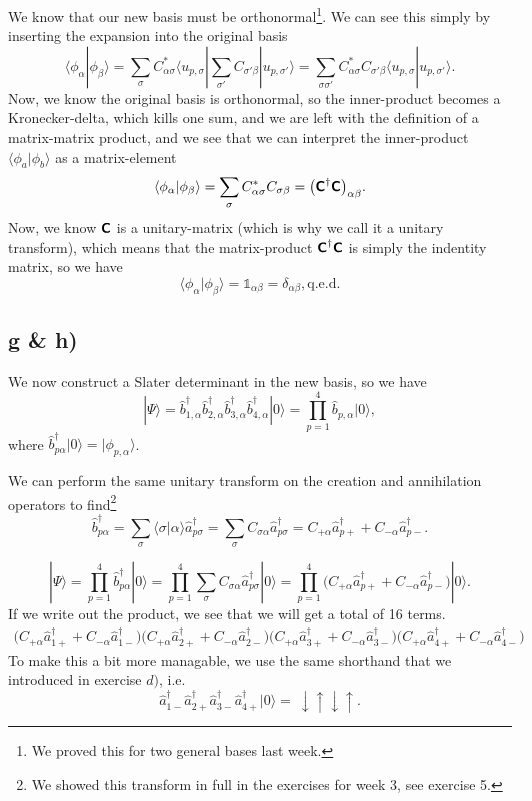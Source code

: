 \documentclass[a4paper, 11pt, notitlepage, english]{article}
\newcommand{\bra}[1]{\langle #1|}
\newcommand{\ket}[1]{|#1 \rangle}
\newcommand{\braket}[2]{\langle #1 | #2 \rangle}
\newcommand{\op}[1]{\hat{#1}}
\renewcommand{\d}{{\rm d}}
\renewcommand{\u}{\uparrow}
\renewcommand{\d}{\downarrow}
\newcommand{\dudu}{\d\u\d\u}
\newcommand{\mat}[1]{\textsf{\textbf{#1}}}
\begin{document}
We know that our new basis must be orthonormal\footnote{We proved this for two general bases last week.}. We can see this simply by inserting the expansion into the original basis
$$\braket{\phi_\alpha}{\phi_\beta} = \sum_{\sigma} C_{\alpha\sigma}^* \bra{u_{p,\sigma}} \sum_{\sigma'} C_{\sigma'\beta} \ket{u_{p,\sigma'}} = \sum_{\sigma\sigma'} C_{\alpha\sigma}^*C_{\sigma'\beta} \braket{u_{p,\sigma}}{u_{p,\sigma'}}.$$
Now, we know the original basis is orthonormal, so the inner-product becomes a Kronecker-delta, which kills one sum, and we are left with the definition of a matrix-matrix product, and we see that we can interpret the inner-product $\braket{\phi_a}{\phi_b}$ as a matrix-element
$$\braket{\phi_\alpha}{\phi_\beta} = \sum_{\sigma} C_{\alpha\sigma}^*C_{\sigma\beta}  = \big(\mat{C}^\dagger \mat{C}\big)_{\alpha\beta}.$$
Now, we know $\mat{C}$ is a unitary-matrix (which is why we call it a unitary transform), which means that the matrix-product $\mat{C}^\dagger \mat{C}$ is simply the indentity matrix, so we have
$$\braket{\phi_\alpha}{\phi_\beta} = \mathbb{1}_{\alpha\beta} = \delta_{\alpha\beta}, \mbox{q.e.d.}$$

\subsection*{g \& h)}
We now construct a Slater determinant in the new basis, so we have
$$\ket{\Psi} = \op{b}_{1,\alpha}^\dagger \op{b}_{2,\alpha}^\dagger \op{b}_{3,\alpha}^\dagger \op{b}_{4,\alpha} ^\dagger \ket{0} = \prod_{p=1}^4 \op{b}_{p,\alpha}\ket{0},$$
where $\op{b}_{p\alpha}^\dagger\ket{0} = \ket{\phi_{p,\alpha}}$.

We can perform the same unitary transform on the creation and annihilation operators to find\footnote{We showed this transform in full in the exercises for week 3, see exercise 5.}
$$\op{b}_{p\alpha}^\dagger = \sum_\sigma \braket{\sigma}{\alpha} \op{a}_{p\sigma}^\dagger = \sum_\sigma C_{\sigma\alpha} \op{a}_{p\sigma}^\dagger = C_{+\alpha}\op{a}_{p+}^\dagger + C_{-\alpha}\op{a}_{p-}^\dagger.$$

$$\ket{\Psi} = \prod_{p=1}^4 \op{b}_{p\alpha}^\dagger\ket{0} = \prod_{p=1}^4\sum_\sigma C_{\sigma\alpha} \op{a}_{p\sigma}^\dagger \ket{0} = \prod_{p=1}^4 \big(C_{+\alpha}\op{a}_{p+}^\dagger + C_{-\alpha}\op{a}_{p-}^\dagger\big) \ket{0}.$$
If we write out the product, we see that we will get a total of 16 terms.
\begin{align*}
\big(C_{+\alpha}\op{a}_{1+}^\dagger + C_{-\alpha}\op{a}_{1-}^\dagger\big)
\big(C_{+\alpha}\op{a}_{2+}^\dagger + C_{-\alpha}\op{a}_{2-}^\dagger\big)
\big(C_{+\alpha}\op{a}_{3+}^\dagger + C_{-\alpha}\op{a}_{3-}^\dagger\big)
\big(C_{+\alpha}\op{a}_{4+}^\dagger + C_{-\alpha}\op{a}_{4-}^\dagger\big)
\end{align*}
To make this a bit more managable, we use the same shorthand that we introduced in exercise $d)$, i.e.
$$\op{a}_{1-}^\dagger\op{a}_{2+}^\dagger\op{a}_{3-}^\dagger\op{a}_{4+}^\dagger\ket{0} = \ \dudu.$$
\end{document}

